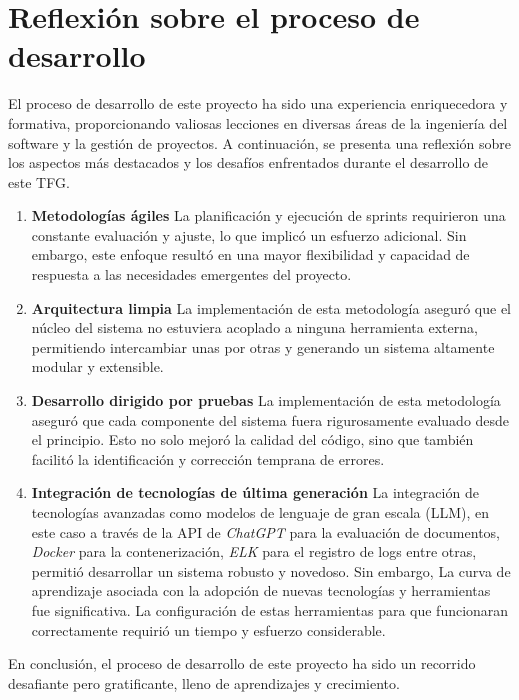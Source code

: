 \section{Reflexión sobre el proceso de desarrollo}

El proceso de desarrollo de este proyecto ha sido una experiencia enriquecedora y formativa, proporcionando valiosas
lecciones en diversas áreas de la ingeniería del software y la gestión de proyectos.
A continuación, se presenta una reflexión sobre los aspectos más destacados y los desafíos enfrentados durante el
desarrollo de este TFG.

\begin{enumerate}
    \item \textbf{Metodologías ágiles}
    La planificación y ejecución de sprints requirieron una constante evaluación y ajuste, lo que implicó un esfuerzo
    adicional.
    Sin embargo, este enfoque resultó en una mayor flexibilidad y capacidad de respuesta a las necesidades emergentes
    del proyecto.
    \item \textbf{Arquitectura limpia}
    La implementación de esta metodología aseguró que el núcleo del sistema no estuviera acoplado a ninguna
    herramienta externa, permitiendo intercambiar unas por otras y generando un sistema altamente modular y extensible.
    \item \textbf{Desarrollo dirigido por pruebas}
    La implementación de esta metodología aseguró que cada componente del sistema fuera rigurosamente evaluado desde el
    principio.
    Esto no solo mejoró la calidad del código, sino que también facilitó la identificación y corrección temprana de
    errores.
    \item \textbf{Integración de tecnologías de última generación}
    La integración de tecnologías avanzadas como modelos de lenguaje de gran escala (LLM), en este caso a través de
    la API de \textit{ChatGPT} para la evaluación de documentos, \textit{Docker} para la contenerización, \textit{ELK}
    para el registro de logs entre otras, permitió desarrollar un sistema robusto y novedoso.
    Sin embargo, La curva de aprendizaje asociada con la adopción de nuevas tecnologías y herramientas fue
    significativa.
    La configuración de estas herramientas para que funcionaran correctamente requirió un tiempo y esfuerzo
    considerable.
\end{enumerate}

En conclusión, el proceso de desarrollo de este proyecto ha sido un recorrido desafiante pero gratificante, lleno de
aprendizajes y crecimiento.
